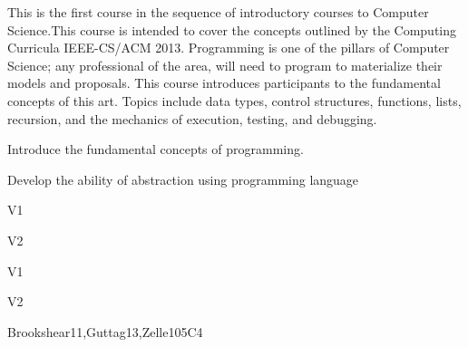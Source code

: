 \begin{syllabus}


\begin{justification}
This is the first course in the sequence of introductory courses to Computer Science.This course is intended to cover the concepts outlined by the
Computing Curricula IEEE-CS/ACM 2013.
Programming is one of the pillars of Computer Science; any professional of the area, will need to program to materialize their models and proposals.
This course introduces participants to the fundamental concepts of this art.
Topics include data types, control structures, functions, lists, recursion, and the mechanics of execution, testing, and debugging.
\end{justification}

\begin{goals}
\item Introduce the fundamental concepts of programming.
\item Develop the ability of abstraction using programming language
\end{goals}

\begin{outcomes}{V1}
    \item {}
    \item {}
\end{outcomes}

\begin{outcomes}{V2}
    \item {}
    \item {}
\end{outcomes}

\begin{competences}{V1}
    \item {} 
    \item {} 
\end{competences}

\begin{competences}{V2}
    \item {} 
    \item {} 
\end{competences}

\begin{unit}{\SPHistory}{}{Brookshear11,Guttag13,Zelle10}{5}{C4}
    \begin{topics}
        \item \SPHistoryTopicPrehistory
        \item \SPHistoryTopicHistory
        \item \SPHistoryTopicPioneers
        \item \SPHistoryTopicHistoryOf
    \end{topics}
    

\end{unit}
\end{syllabus}
